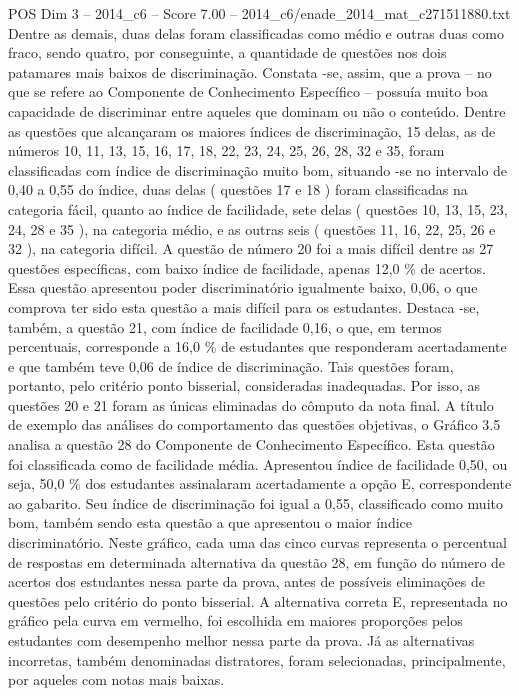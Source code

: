 \begin{textsample}{POS Dim 3 – 2014\_c6 – Score 7.00 – 2014\_c6/enade\_2014\_mat\_c271511880.txt}
Dentre as demais, duas delas foram classificadas como médio e outras duas como fraco, sendo quatro, por conseguinte, a quantidade de questões nos dois patamares mais baixos de discriminação.
Constata -se, assim, que a prova – no que se refere ao Componente de Conhecimento Específico – possuía muito boa capacidade de discriminar entre aqueles que dominam ou não o conteúdo.
Dentre as questões que alcançaram os maiores índices de discriminação, 15 delas, as de números 10, 11, 13, 15, 16, 17, 18, 22, 23, 24, 25, 26, 28, 32 e 35, foram classificadas com índice de discriminação muito bom, situando -se no intervalo de 0,40 a 0,55 do índice, duas delas ( questões 17 e 18 ) foram classificadas na categoria fácil, quanto ao índice de facilidade, sete delas ( questões 10, 13, 15, 23, 24, 28 e 35 ), na categoria médio, e as outras seis ( questões 11, 16, 22, 25, 26 e 32 ), na categoria difícil.
A questão de número 20 foi a mais difícil dentre as 27 questões específicas, com baixo índice de facilidade, apenas 12,0 \% de acertos.
Essa questão apresentou poder discriminatório igualmente baixo, 0,06, o que comprova ter sido esta questão a mais difícil para os estudantes.
Destaca -se, também, a questão 21, com índice de facilidade 0,16, o que, em termos percentuais, corresponde a 16,0 \% de estudantes que responderam acertadamente e que também teve 0,06 de índice de discriminação.
Tais questões foram, portanto, pelo critério ponto bisserial, consideradas inadequadas.
Por isso, as questões 20 e 21 foram as únicas eliminadas do cômputo da nota final.
A título de exemplo das análises do comportamento das questões objetivas, o Gráfico 3.5 analisa a questão 28 do Componente de Conhecimento Específico.
Esta questão foi classificada como de facilidade média.
Apresentou índice de facilidade 0,50, ou seja, 50,0 \% dos estudantes assinalaram acertadamente a opção E, correspondente ao gabarito.
Seu índice de discriminação foi igual a 0,55, classificado como muito bom, também sendo esta questão a que apresentou o maior índice discriminatório.
Neste gráfico, cada uma das cinco curvas representa o percentual de respostas em determinada alternativa da questão 28, em função do número de acertos dos estudantes nessa parte da prova, antes de possíveis eliminações de questões pelo critério do ponto bisserial.
A alternativa correta E, representada no gráfico pela curva em vermelho, foi escolhida em maiores proporções pelos estudantes com desempenho melhor nessa parte da prova.
Já as alternativas incorretas, também denominadas distratores, foram selecionadas, principalmente, por aqueles com notas mais baixas.

\end{textsample}
